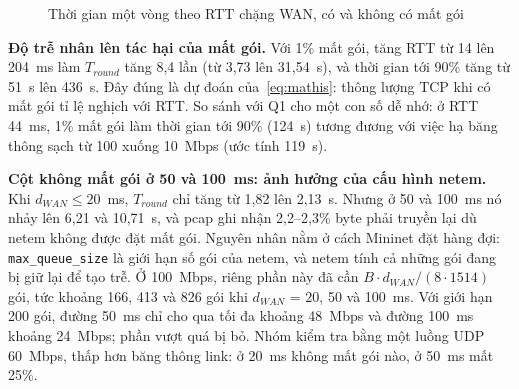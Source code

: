 \begin{figure}[H]
    \centering
    \caption{Thời gian một vòng theo RTT chặng WAN, có và không có mất gói}
    \label{fig:q2delay}
\end{figure}

\textbf{Độ trễ nhân lên tác hại của mất gói.} Với 1\% mất gói, tăng RTT từ 14 lên 204~ms làm $T_{round}$ tăng 8{,}4 lần (từ 3{,}73 lên 31{,}54~s), và thời gian tới 90\% tăng từ 51~s lên 436~s. Đây đúng là dự đoán của~\eqref{eq:mathis}: thông lượng TCP khi có mất gói tỉ lệ nghịch với RTT. So sánh với Q1 cho một con số dễ nhớ: ở RTT 44~ms, 1\% mất gói làm thời gian tới 90\% (124~s) tương đương với việc hạ băng thông sạch từ 100 xuống 10~Mbps (ước tính 119~s).

\textbf{Cột không mất gói ở 50 và 100~ms: ảnh hưởng của cấu hình netem.} Khi $d_{WAN} \le 20$~ms, $T_{round}$ chỉ tăng từ 1{,}82 lên 2{,}13~s. Nhưng ở 50 và 100~ms nó nhảy lên 6{,}21 và 10{,}71~s, và pcap ghi nhận 2{,}2--2{,}3\% byte phải truyền lại dù netem không được đặt mất gói. Nguyên nhân nằm ở cách Mininet đặt hàng đợi: \nolinkurl{max_queue_size} là giới hạn số gói của netem, và netem tính cả những gói đang bị giữ lại để tạo trễ. Ở 100~Mbps, riêng phần này đã cần $B \cdot d_{WAN} / (8 \cdot 1514)$ gói, tức khoảng 166, 413 và 826 gói khi $d_{WAN}$ = 20, 50 và 100~ms. Với giới hạn 200 gói, đường 50~ms chỉ cho qua tối đa khoảng 48~Mbps và đường 100~ms khoảng 24~Mbps; phần vượt quá bị bỏ. Nhóm kiểm tra bằng một luồng UDP 60~Mbps, thấp hơn băng thông link: ở 20~ms không mất gói nào, ở 50~ms mất 25\%.

